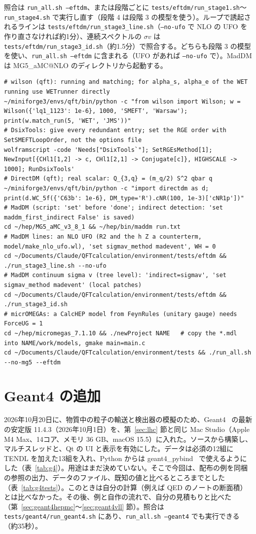 \documentclass[a4paper,10pt]{ltjsarticle}
\makeatletter
\newcommand{\MGaMC}{MG5\_aMC@NLO}
\makeatother
\begin{document}
照合は \texttt{run\_all.sh --eftdm}、または段階ごとに \nolinkurl{tests/eftdm/run_stage1.sh}〜\texttt{run\_stage4.sh} で実行し直す（段階 4 は段階 3 の模型を使う）。ループで誘起されるラインは \nolinkurl{tests/eftdm/run_stage3_line.sh}（\texttt{--no-ufo} で NLO の UFO を作り直さなければ約1分）、連続スペクトルの $\sigma v$ は \nolinkurl{tests/eftdm/run_stage3_id.sh}（約1.5分）で照合する。どちらも段階 3 の模型を使い、\texttt{run\_all.sh --eftdm} に含まれる（UFO があれば \texttt{--no-ufo} で）。MadDM は \MGaMC{} のディレクトリから起動する。
\begin{Verbatim}
# wilson (qft): running and matching; for alpha_s, alpha_e of the WET running use WETrunner directly
~/miniforge3/envs/qft/bin/python -c "from wilson import Wilson; w = Wilson({'lq1_1123': 1e-6}, 1000, 'SMEFT', 'Warsaw'); print(w.match_run(5, 'WET', 'JMS'))"
# DsixTools: give every redundant entry; set the RGE order with SetSMEFTLoopOrder, not the options file
wolframscript -code 'Needs["DsixTools`"]; SetRGEsMethod[1]; NewInput[{CHl1[1,2] -> c, CHl1[2,1] -> Conjugate[c]}, HIGHSCALE -> 1000]; RunDsixTools'
# DirectDM (qft); real scalar: Q_{3,q} = (m_q/2) S^2 qbar q
~/miniforge3/envs/qft/bin/python -c "import directdm as d; print(d.WC_5f({'C63b': 1e-6}, DM_type='R').cNR(100, 1e-3)['cNR1p'])"
# MadDM (script: 'set' before 'done'; indirect detection: 'set maddm_first_indirect False' is saved)
cd ~/hep/MG5_aMC_v3_8_1 && ~/hep/bin/maddm run.txt
# MadDM lines: an NLO UFO (R2 and the h Z a counterterm, model/make_nlo_ufo.wl), 'set sigmav_method madevent', WH = 0
cd ~/Documents/Claude/QFTcalculation/environment/tests/eftdm && ./run_stage3_line.sh --no-ufo
# MadDM continuum sigma v (tree level): 'indirect=sigmav', 'set sigmav_method madevent' (local patches)
cd ~/Documents/Claude/QFTcalculation/environment/tests/eftdm && ./run_stage3_id.sh
# micrOMEGAs: a CalcHEP model from FeynRules (unitary gauge) needs ForceUG = 1
cd ~/hep/micromegas_7.1.10 && ./newProject NAME   # copy the *.mdl into NAME/work/models, gmake main=main.c
cd ~/Documents/Claude/QFTcalculation/environment/tests && ./run_all.sh --no-mg5 --eftdm
\end{Verbatim}

\section{Geant4 の追加}\label{sec:geant4}

2026年10月20日に、物質中の粒子の輸送と検出器の模擬のため、Geant4~\cite{geant4a,geant4b,geant4c} の最新の安定版 11.4.3（2026年10月1日）を、第~\ref{sec:lhc} 節と同じ Mac Studio（Apple M4 Max、14コア、メモリ 36 GB、macOS 15.5）に入れた。ソースから構築し、マルチスレッドと、Qt の UI と表示を有効にした。データは必須の12組に TENDL を加えた13組を入れ、Python からは geant4\_pybind~\cite{url:geant4pybind} で使えるようにした（表~\ref{tab:g4}）。用途はまだ決めていない。そこで今回は、配布の例を同梱の参照の出力、データのファイル、既知の値と比べるところまでとした（表~\ref{tab:g4tests}）。このときは自分の計算（例えば QED のノートの断面積）とは比べなかった。その後、例と自作の流れで、自分の見積もりと比べた（第~\ref{sec:geant4hepmc}〜\ref{sec:geant4vll} 節）。照合は \nolinkurl{tests/geant4/run_geant4.sh} にあり、\texttt{run\_all.sh --geant4} でも実行できる（約35秒）。
\end{document}
